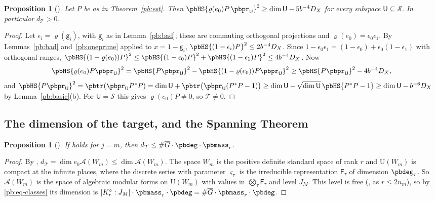 \documentclass[10pt]{amsart}
\newtheorem{proposition}[theorem]{Proposition}
\theoremstyle{definition}
\theoremstyle{remark}
\providecommand{\auDX}{D_X}
\providecommand{\auG}{\overline G}
\providecommand{\auS}{\mathcal S}
\providecommand{\auT}{\mathcal T}
\providecommand{\auU}{\mathrm U}
\providecommand{\audT}{d_{\auT}}
\begin{document}
\begin{proposition}[{\cite[Proposition~14.32(ii)]{P46}}]\label{pb:ii}
Let $P$ be as in Theorem~\ref{pb:est}. Then $\pbHS{\varrho(e_0)P\,\pbpr_{\mathsf U}}^2\ge\dim
\mathsf U-5b^{-4}\auDX$ for every subspace $\mathsf U\subseteq\auS$. In particular $\audT>0$.
\end{proposition}
\begin{proof}
Let $\epsilon_i=\varrho(\mathsf g_i)$, with $\mathsf g_i$ as in Lemma~\ref{pb:bad}; these are
commuting orthogonal projections and $\varrho(e_0)=\epsilon_0\epsilon_1$. By Lemmas~\ref{pb:bad}
and~\ref{pb:oneprime} applied to $x=1-\mathsf g_i$, $\pbHS{(1-\epsilon_i)P}^2\le2b^{-4}\auDX$. Since
$1-\epsilon_0\epsilon_1=(1-\epsilon_0)+\epsilon_0(1-\epsilon_1)$ with orthogonal ranges,
$\pbHS{(1-\varrho(e_0))P}^2\le\pbHS{(1-\epsilon_0)P}^2+\pbHS{(1-\epsilon_1)P}^2\le4b^{-4}\auDX$. Now
\[
\pbHS{\varrho(e_0)P\pbpr_{\mathsf U}}^2=\pbHS{P\pbpr_{\mathsf U}}^2-\pbHS{(1-\varrho(e_0))P\pbpr_{
\mathsf U}}^2\ge\pbHS{P\pbpr_{\mathsf U}}^2-4b^{-4}\auDX ,
\]
and $\pbHS{P\pbpr_{\mathsf U}}^2=\pbtr(\pbpr_{\mathsf U}P^*P)=\dim\mathsf U+\pbtr\bigl(\pbpr_{\mathsf
U}(P^*P-1)\bigr)\ge\dim\mathsf U-\sqrt{\dim\mathsf U}\,\pbHS{P^*P-1}\ge\dim\mathsf U-b^{-6}\auDX$ by
Lemma~\ref{pb:basic}(b). For $\mathsf U=\auS$ this gives $\varrho(e_0)P\ne0$, so $\auT\ne0$.
\end{proof}

\subsection{The dimension of the target, and the Spanning Theorem}\label{pb:ss-thmB}

\begin{proposition}[{\cite[Proposition~14.32(i)]{P46}}]\label{pb:i}
If {\cite[Proposition~14.36]{P46}} holds for $j=m$, then $\audT\le\#\auG\cdot\pbdeg\cdot\pbmass_r$.
\end{proposition}
\begin{proof}
By {\cite[Proposition~14.36]{P46}}, $\audT=\dim e_0\mathcal A(W_m)\le\dim\mathcal A(W_m)$. The space
$W_m$ is the positive definite standard space of rank $r$ and $\auU(W_m)$ is compact at the
infinite places, where the discrete series with parameter $\varsigma_\tau$ is the irreducible
representation $\mathsf F_\tau$ of dimension $\pbdeg_\tau$. So $\mathcal A(W_m)$ is the space of
algebraic modular forms on $\auU(W_m)$ with values in $\bigotimes_\tau\mathsf F_\tau$ and level
$J_M$. This level is free ({\cite[Lemma~14.5]{P46}}, as $r\le2n_m$), so by \eqref{pb:eq-classes} its
dimension is $[K^\circ_r:J_M]\cdot\pbmass_r\cdot\pbdeg=\#\auG\cdot\pbmass_r\cdot\pbdeg$.
\end{proof}
\end{document}
